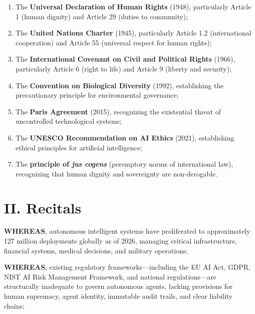 \begin{enumerate}[leftmargin=2cm,label=\textbf{\arabic*.}]
    \item The \textbf{Universal Declaration of Human Rights} (1948), particularly Article 1 (human dignity) and Article 29 (duties to community);
    
    \item The \textbf{United Nations Charter} (1945), particularly Article 1.2 (international cooperation) and Article 55 (universal respect for human rights);
    
    \item The \textbf{International Covenant on Civil and Political Rights} (1966), particularly Article 6 (right to life) and Article 9 (liberty and security);
    
    \item The \textbf{Convention on Biological Diversity} (1992), establishing the precautionary principle for environmental governance;
    
    \item The \textbf{Paris Agreement} (2015), recognizing the existential threat of uncontrolled technological systems;
    
    \item The \textbf{UNESCO Recommendation on AI Ethics} (2021), establishing ethical principles for artificial intelligence;
    
    \item The \textbf{principle of \textit{jus cogens}} (peremptory norms of international law), recognizing that human dignity and sovereignty are non-derogable.
\end{enumerate}

\vspace{0.5cm}

\section*{II. Recitals}

\textbf{WHEREAS}, autonomous intelligent systems have proliferated to approximately 127 million deployments globally as of 2026, managing critical infrastructure, financial systems, medical decisions, and military operations;

\textbf{WHEREAS}, existing regulatory frameworks—including the EU AI Act, GDPR, NIST AI Risk Management Framework, and national regulations—are structurally inadequate to govern autonomous agents, lacking provisions for human supremacy, agent identity, immutable audit trails, and clear liability chains;


